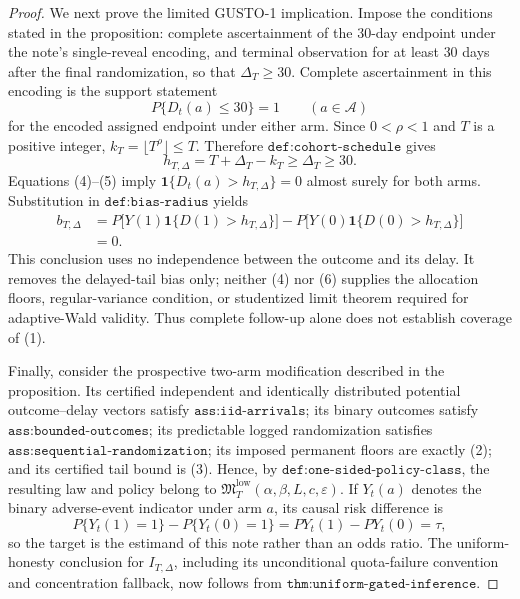 \documentclass{article}
\begin{document}
\begin{proof}
We next prove the limited GUSTO-1 implication.  Impose the conditions stated in the proposition: complete ascertainment of the \(30\)-day endpoint under the note's single-reveal encoding, and terminal observation for at least \(30\) days after the final randomization, so that \(\Delta_T\geq30\).  Complete ascertainment in this encoding is the support statement
\[
 P\{D_t(a)\leq30\}=1
 \qquad(a\in\mathcal A)
\tag{4}
\]
for the encoded assigned endpoint under either arm.  Since \(0<\rho<1\) and \(T\) is a positive integer, \(k_T=\lfloor T^\rho\rfloor\leq T\).  Therefore \(\texttt{def:cohort-schedule}\) gives
\[
 h_{T,\Delta}=T+\Delta_T-k_T\geq\Delta_T\geq30.
\tag{5}
\]
Equations (4)--(5) imply \(\mathbf 1\{D_t(a)>h_{T,\Delta}\}=0\) almost surely for both arms.  Substitution in \(\texttt{def:bias-radius}\) yields
\[
 \begin{aligned}
 b_{T,\Delta}
 &=P\bigl[Y(1)\mathbf 1\{D(1)>h_{T,\Delta}\}\bigr]
   -P\bigl[Y(0)\mathbf 1\{D(0)>h_{T,\Delta}\}\bigr]\\
 &=0.
 \end{aligned}
\tag{6}
\]
This conclusion uses no independence between the outcome and its delay.  It removes the delayed-tail bias only; neither (4) nor (6) supplies the allocation floors, regular-variance condition, or studentized limit theorem required for adaptive-Wald validity.  Thus complete follow-up alone does not establish coverage of (1).

Finally, consider the prospective two-arm modification described in the proposition.  Its certified independent and identically distributed potential outcome--delay vectors satisfy \(\texttt{ass:iid-arrivals}\); its binary outcomes satisfy \(\texttt{ass:bounded-outcomes}\); its predictable logged randomization satisfies \(\texttt{ass:sequential-randomization}\); its imposed permanent floors are exactly (2); and its certified tail bound is (3).  Hence, by \(\texttt{def:one-sided-policy-class}\), the resulting law and policy belong to
\(\mathfrak M_T^{\mathrm{low}}(\alpha,\beta,L,c,\varepsilon)\).  If \(Y_t(a)\) denotes the binary adverse-event indicator under arm \(a\), its causal risk difference is
\[
 P\{Y_t(1)=1\}-P\{Y_t(0)=1\}
 =P Y_t(1)-P Y_t(0)=\tau,
\tag{7}
\]
so the target is the estimand of this note rather than an odds ratio.  The uniform-honesty conclusion for \(I_{T,\Delta}\), including its unconditional quota-failure convention and concentration fallback, now follows from \(\texttt{thm:uniform-gated-inference}\).


\end{proof}
\end{document}
